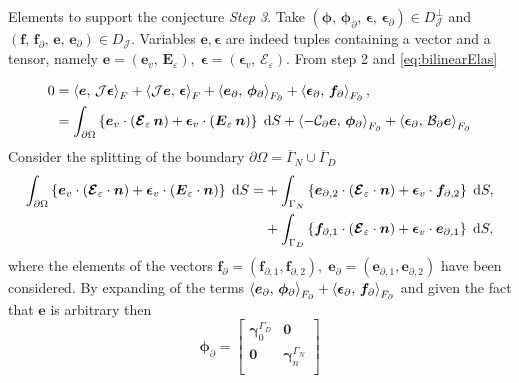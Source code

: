 \begin{paragraph}{Elements to support the conjecture}
	\textit{Step 3}. Take $(\bm{\phi}, \, \bm{\phi}_\partial, \, \bm{\epsilon}, \, \bm{\epsilon}_\partial) \in {D}_{\mathcal{J}}^\perp$ and $(\bm{f}, \, \bm{f}_\partial, \, \bm{e}, \, \bm{e}_\partial) \in {D}_{\mathcal{J}}$. Variables $\bm{e}, \bm{\epsilon}$ are indeed tuples containing a vector and a tensor, namely $\bm{e} = (\bm{e}_v, \, \bm{E}_\varepsilon), \;\bm{\epsilon} = (\bm{\epsilon}_v, \, \bm{\mathcal{E}}_\varepsilon)$. From step 2 and \eqref{eq:bilinearElas}
	
	\begin{align*}
	0 &=\inner[F]{\bm{e}}{\mathcal{J}\bm{\epsilon}} + \inner[F]{\mathcal{J}\bm{e}}{\bm{\epsilon}}+ \inner[F_\partial]{\bm{e}_{\partial}}{\bm{\phi}_{\partial}} +  \inner[F_\partial]{\bm{\epsilon}_{\partial}}{\bm{f}_{\partial}}, \\
	&=\int_{\partial\Omega} \left\{\bm{e}_v \cdot (\bm{\mathcal{E}}_\varepsilon \, \bm{n}) + \bm{\epsilon}_v \cdot (\bm{{E}}_\varepsilon \, \bm{n})\right\}  \d{S} + \inner[F_\partial]{-\mathcal{C}_{\partial}\bm{e}}{\bm{\phi}_{\partial}} +  \inner[F_\partial]{\bm{\epsilon}_{\partial}}{\mathcal{B}_{\partial}\bm{e}}
	\end{align*}
	Consider the splitting of the boundary $\partial\Omega = \overline{\Gamma}_N \cup \overline{\Gamma}_D$
	\begin{align*}
	\int_{\partial\Omega} \left\{\bm{e}_v \cdot (\bm{\mathcal{E}}_\varepsilon \cdot \bm{n}) + \bm{\epsilon}_v \cdot (\bm{{E}}_\varepsilon \cdot \bm{n})\right\}  \d{S} 
	=& +\int_{\Gamma_N} \left\{\bm{e}_{\partial, 2} \cdot (\bm{\mathcal{E}}_\varepsilon \cdot \bm{n}) + \bm{\epsilon}_v \cdot \bm{f}_{\partial, 2}\right\}  \d{S}, \\
	&+ \int_{\Gamma_D} \left\{\bm{f}_{\partial, 1} \cdot (\bm{\mathcal{E}}_\varepsilon \cdot \bm{n}) + \bm{\epsilon}_v \cdot \bm{e}_{\partial, 1}\right\}  \d{S},
	\end{align*}
	where the elements of the vectors $\bm{f}_{\partial} = (\bm{f}_{\partial, 1}, \bm{f}_{\partial, 2}), \; \bm{e}_{\partial} = (\bm{e}_{\partial, 1}, \bm{e}_{\partial, 2})$ have been considered. By expanding of the terms $\inner[F_\partial]{\bm{e}_{\partial}}{\bm{\phi}_{\partial}} +  \inner[F_\partial]{\bm{\epsilon}_{\partial}}{\bm{f}_{\partial}}$ and given the fact that $\bm{e}$ is arbitrary then
	\begin{equation*}
	\bm{\phi}_{\partial} = \begin{bmatrix}
	\bm\gamma_{0}^{\Gamma_D} & \bm{0} \\
	\bm{0} & \bm\gamma_n^{\Gamma_N} \\

\end{bmatrix}
\end{equation*}
\end{paragraph}
